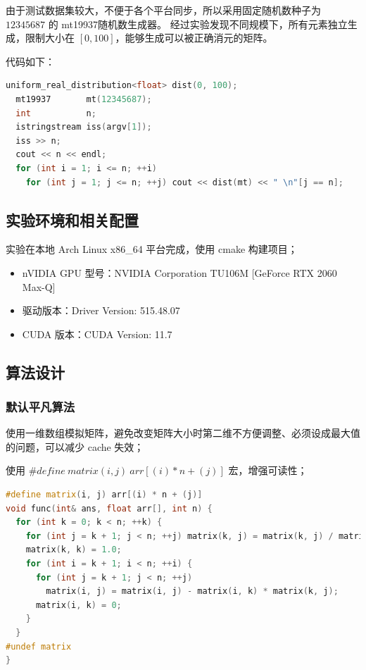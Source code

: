 \documentclass[a4paper]{article}
\begin{document}
由于测试数据集较大，不便于各个平台同步，所以采用固定随机数种子为 $12345687$ 的 mt19937随机数生成器。
经过实验发现不同规模下，所有元素独立生成，限制大小在 $[0, 100]$，能够生成可以被正确消元的矩阵。

代码如下：

\begin{lstlisting}[title=测试数据集生成器,frame=trbl,language={C++}]
  uniform_real_distribution<float> dist(0, 100);
  mt19937       mt(12345687);
  int           n;
  istringstream iss(argv[1]);
  iss >> n;
  cout << n << endl;
  for (int i = 1; i <= n; ++i)
    for (int j = 1; j <= n; ++j) cout << dist(mt) << " \n"[j == n];
\end{lstlisting}

\subsection{实验环境和相关配置}

实验在本地 Arch Linux x86\_64 平台完成，使用 cmake 构建项目；

\begin{itemize}
  \item nVIDIA GPU 型号：NVIDIA Corporation TU106M [GeForce RTX 2060 Max-Q]
  \item 驱动版本：Driver Version: 515.48.07
  \item CUDA 版本：CUDA Version: 11.7
\end{itemize}

\subsection{算法设计}

\subsubsection{默认平凡算法}

使用一维数组模拟矩阵，避免改变矩阵大小时第二维不方便调整、必须设成最大值的问题，可以减少 cache 失效；

使用 $\#define\ matrix(i, j)\ arr[(i) * n + (j)]$ 宏，增强可读性；

\begin{lstlisting}[title=平凡算法,frame=trbl,language={C++}]
#define matrix(i, j) arr[(i) * n + (j)]
void func(int& ans, float arr[], int n) {
  for (int k = 0; k < n; ++k) {
    for (int j = k + 1; j < n; ++j) matrix(k, j) = matrix(k, j) / matrix(k, k);
    matrix(k, k) = 1.0;
    for (int i = k + 1; i < n; ++i) {
      for (int j = k + 1; j < n; ++j)
        matrix(i, j) = matrix(i, j) - matrix(i, k) * matrix(k, j);
      matrix(i, k) = 0;
    }
  }
#undef matrix
}
\end{lstlisting}




% 
% 
\end{document}

